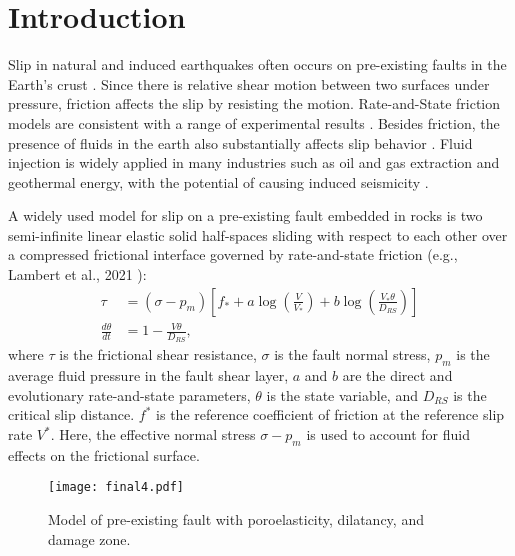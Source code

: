 \section{Introduction}
\label{sec:introduction}
Slip in natural and induced earthquakes often occurs on pre-existing faults in the Earth's crust \cite{scholz_1989}. 
Since there is relative shear motion between two surfaces under pressure, 
friction affects the slip by resisting the motion. 
Rate-and-State friction models are consistent with a range of experimental results \cite{dieterich_modeling_1979, dieterich_potential_1981, scholz_earthquakes_1998, marone_laboratory-derived_1998, Dieterich2007, rubino_understanding_2017}. 
Besides friction, 
the presence of fluids in the earth also substantially affects slip behavior \cite{segall_dilatancy_1995, Segall2010, wei_2012_2015, deng_poroelastic_2016, cappa_stabilization_2019, bhattacharya_induced_2019, Heimisson2019}.
Fluid injection is widely applied in many industries such as oil and gas extraction and geothermal energy, with the potential of causing induced seismicity \cite{ellsworth_injection-induced_2013, grigoli_current_2017}.


A widely used model for slip on a pre-existing fault embedded in rocks is two semi-infinite linear elastic solid half-spaces sliding with respect to each other over a compressed frictional interface governed by rate-and-state friction (e.g., Lambert et al., 2021 \cite{Lambert2021}):
%
\begin{align}
    \tau &= (\sigma - p_m)\left[f_* + a \log\left(\frac{V}{V_*}\right)+b\log\left(\frac{V_*\theta}{D_{RS}}\right)\right] \label{eq:RSF1}\\
    \frac{d\theta}{dt} &= 1-\frac{V\theta}{D_{RS}} \label{eq:RSF2},
\end{align}
where $\tau$ is the frictional shear resistance, $\sigma$ is the fault normal stress, $p_m$ is the average fluid pressure in the fault shear layer, $a$ and $b$ are the direct and evolutionary rate-and-state parameters, $\theta$ is the state variable, and $D_{RS}$ is the critical slip distance. $f^*$ is the reference coefficient of friction at the reference slip rate $V^*$.
Here, the effective normal stress $\sigma - p_m$ is used to account for fluid effects on the frictional surface.

\begin{figure}[ht]
    \centering
    \texttt{[image: final4.pdf]}
    \caption{Model of pre-existing fault with poroelasticity, dilatancy, and damage zone.}
    \label{fig:conclusion 1}
\end{figure}

